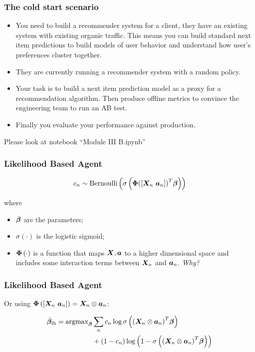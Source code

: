 \begin{frame}
  \frametitle{The cold start scenario}

    \begin{itemize}
      \item You need to build a recommender system for a client, they have an existing system with existing organic traffic.  \pause This means you can build standard next item predictions to build models of user behavior and understand how user's preferences cluster together. \pause
      \item They are currently running a recommender system with a random policy. \pause
      \item Your task is to build a next item prediction model as a proxy for a recommendation algorithm.  Then produce offline metrics to convince the engineering team to run an AB test.\pause
      \item Finally you evaluate your performance against production.
    \end{itemize}

    \pause
    Please look at notebook ``Module III B.ipynb''

\end{frame}




\begin{frame}
  \frametitle{Likelihood Based Agent}

  \[
    c_n \sim {\rm Bernoulli}
      \left(
        \sigma
          \left(
      \bm{\Phi} {\left( [\bm{X}_n ~ \bm{a}_n] \right)}^T \bm{\beta}
          \right)
      \right)
    \]

    where
    \begin{itemize}
      \item $\bm{\beta}$ are the parameters;
      \item $\sigma \left( \cdot \right)$ is the logistic sigmoid;
      \item $\bm{\Phi} \left( \cdot \right)$ is a function that maps $\bm{X},\bm{a}$ to a higher dimensional space and includes some interaction terms between ${\bm{X}}_n$ and ${\bm{a}}_n$. \pause \emph{Why?}
    \end{itemize}
    


\end{frame}

\begin{frame}
  \frametitle{Likelihood Based Agent}

Or using $\bm{\Phi} \left( \left[ {\bm{X}}_n ~ {\bm{a}}_n \right] \right) = {\bm{X}}_n \otimes {\bm{a}}_n$:

\begin{align*}
	\hat{\bm{\beta}}_{\rm lh} = {\rm argmax}_{\bm{\beta}}
	& \sum_n c_n \log \sigma
				\left(
					{
						\left(
							{\bm{X}}_n \otimes {\bm{a}}_n
						\right)
					}^T \bm{\beta}
				\right) \\
	& + \left(
		1-c_n
	  \right)
	  \log
	  \left(
	  	1 - \sigma
			\left(
				{
					\left(
						{\bm{X}}_n \otimes {\bm{a}}_n
					\right)
				}^T \bm{\beta}
			\right)
	\right)
  \end{align*}
\end{frame}


